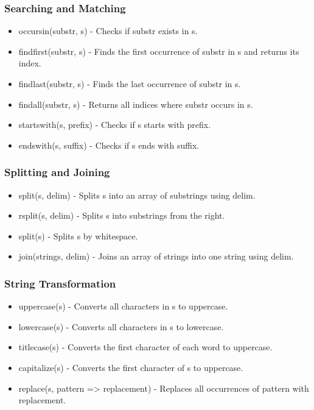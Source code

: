 \documentclass{report}
\begin{document}
    \subsubsection{Searching and Matching}
    \begin{itemize}
        \item occursin(substr, s) - Checks if substr exists in s.
        \item findfirst(substr, s) - Finds the first occurrence of substr in s and returns its index.
        \item findlast(substr, s) - Finds the last occurrence of substr in s.
        \item findall(substr, s) - Returns all indices where substr occurs in s.
        \item startswith(s, prefix) - Checks if s starts with prefix.
        \item endswith(s, suffix) - Checks if s ends with suffix.
    \end{itemize}

    \bigbreak \noindent 
    \subsubsection{Splitting and Joining}
    \begin{itemize}
        \item split(s, delim) - Splits s into an array of substrings using delim.
        \item rsplit(s, delim) - Splits s into substrings from the right.
        \item split(s) - Splits s by whitespace.
        \item join(strings, delim) - Joins an array of strings into one string using delim.
    \end{itemize}

    \bigbreak \noindent 
    \subsubsection{String Transformation}
    \begin{itemize}
        \item uppercase(s) - Converts all characters in s to uppercase.
        \item lowercase(s) - Converts all characters in s to lowercase.
        \item titlecase(s) - Converts the first character of each word to uppercase.
        \item capitalize(s) - Converts the first character of s to uppercase.
        \item replace(s, pattern => replacement) - Replaces all occurrences of pattern with replacement.
    \end{itemize}
\end{document}

